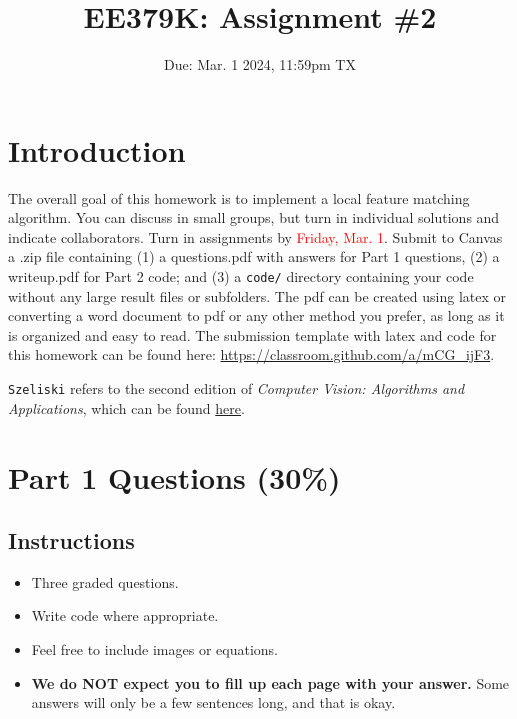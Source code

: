 \documentclass{article}
\title{EE379K: Assignment \#2}
\date{Due: Mar. 1 2024, 11:59pm TX}
\begin{document}
\maketitle


\section*{Introduction}

The overall goal of this homework is to implement a local feature matching algorithm. You can discuss in small groups, but turn in individual solutions and indicate collaborators. Turn in assignments by \textcolor{red}{Friday, Mar. 1}. Submit to Canvas a .zip file containing  (1) a questions.pdf with answers for Part 1 questions, (2) a writeup.pdf for Part 2 code; and (3) a \texttt{code/} directory containing your code without any large result files or subfolders. The pdf can be created using latex or converting a word document to pdf or any other method you prefer, as long as it is organized and easy to read. The submission template with latex and code for this homework can be found here: \href{https://classroom.github.com/a/mCG_ijF3}{https://classroom.github.com/a/mCG\_ijF3}.



\begin{info}
	\texttt{Szeliski} refers to the second edition of \textit{Computer Vision: Algorithms and Applications}, which can be found \href{http://szeliski.org/Book/}{here}.
\end{info}


\section{Part 1 Questions (30\%)}

\subsection*{Instructions}

\begin{itemize}
    \item Three graded questions.
    \item Write code where appropriate.
    \item Feel free to include images or equations.
    \item \textbf{We do NOT expect you to fill up each page with your answer.} Some answers will only be a few sentences long, and that is okay.
  \end{itemize}
\end{document}
